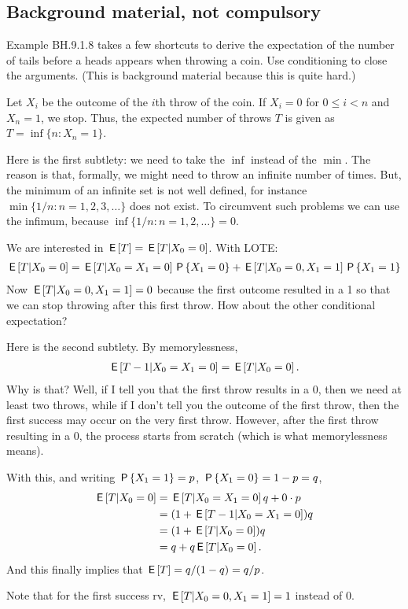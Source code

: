 \subsection{Background material, not compulsory}
\label{sec:backgr-mater-not}

\begin{exercise}
Example BH.9.1.8 takes a few shortcuts to derive the expectation of the number of tails before a heads appears when throwing a coin.
Use conditioning to close the arguments. (This is background material because this is quite hard.)
\begin{solution}
Let $X_{i}$ be the outcome of the $i$th throw of the coin.
If $X_{i}=0$ for $0\leq i< n$ and $X_{n}=1$, we stop.
Thus, the expected number of throws $T$ is given as $T=\inf\{n: X_n=1\}$.

Here is the first subtlety: we need to take the $\inf$ instead of the $\min$.
The reason is that, formally, we might need to throw an infinite number of times.
But, the minimum of an infinite set is not well defined, for instance $\min\{1/n: n=1, 2, 3, \ldots\}$ does not exist.
To circumvent such problems we can use the infimum, because $\inf\{1/n : n = 1, 2, \ldots\} = 0$.

We are interested in $\E T = \E{T|X_{0}=0}$. With LOTE:
\begin{align*}
  \E{T|X_0=0}
  &= \E{T|X_0=X_1=0} \P{X_1=0} + \E{T|X_0=0, X_1=1} \P{X_1=1}\\
\end{align*}
Now $\E{T|X_0=0, X_1=1} = 0$ because the first outcome resulted in a 1 so that we can stop throwing after this first throw.
How about the other conditional expectation?

Here is the second subtlety. By memorylessness,
\begin{align*}
 \E{T-1|X_0=X_1=0} = \E{T|X_0=0}.
\end{align*}
Why is that?
Well, if I tell you that the first throw results in a $0$, then we need at least two throws, while if I don't tell you the outcome of the first throw, then the first success may occur on the very first throw.
However, after the first throw resulting in a $0$, the process starts from scratch (which is what memorylessness means).

With this,  and writing $\P{X_1=1}=p$, $\P{X_1=0} = 1-p = q$,
\begin{align*}
  \E{T|X_0=0}
  &= \E{T|X_0=X_1=0} q + 0\cdot p \\
  &= (1+\E{T-1|X_0=X_1=0}) q \\
  &= (1+\E{T|X_0=0}) q  \\
  &= q + q \E{T|X_0=0}.
\end{align*}
And this finally implies that $\E{T} = q/(1-q) = q/p$.

Note that for the first success rv,  $\E{T|X_0=0, X_1=1} = 1$ instead of $0$.
\end{solution}
\end{exercise}


